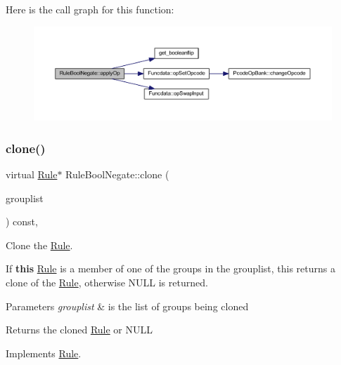 Here is the call graph for this function\+:
\nopagebreak
\begin{figure}[H]
\begin{center}
\leavevmode
\includegraphics[width=350pt]{class_rule_bool_negate_a0cc46713ccb8464cc054c5eef9ad5de1_cgraph}
\end{center}
\end{figure}
\mbox{\label{class_rule_bool_negate_a4e69c7e3e7588953be7ba4a9b987dd23}} 
\subsubsection{\texorpdfstring{clone()}{clone()}}
{\footnotesize\ttfamily virtual \mbox{\hyperlink{class_rule}{Rule}}$\ast$ Rule\+Bool\+Negate\+::clone (\begin{DoxyParamCaption}\item[{const \mbox{\hyperlink{class_action_group_list}{Action\+Group\+List}} \&}]{grouplist }\end{DoxyParamCaption}) const\hspace{0.3cm}{\ttfamily [inline]}, {\ttfamily [virtual]}}



Clone the \mbox{\hyperlink{class_rule}{Rule}}. 

If {\bfseries{this}} \mbox{\hyperlink{class_rule}{Rule}} is a member of one of the groups in the grouplist, this returns a clone of the \mbox{\hyperlink{class_rule}{Rule}}, otherwise N\+U\+LL is returned. 
\begin{DoxyParams}{Parameters}
{\em grouplist} & is the list of groups being cloned \\
\hline
\end{DoxyParams}
\begin{DoxyReturn}{Returns}
the cloned \mbox{\hyperlink{class_rule}{Rule}} or N\+U\+LL 
\end{DoxyReturn}


Implements \mbox{\hyperlink{class_rule_a70de90a76461bfa7ea0b575ce3c11e4d}{Rule}}.




